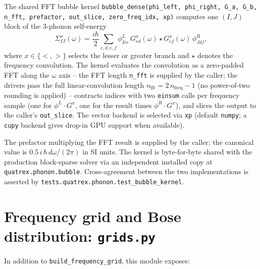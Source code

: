 The shared FFT bubble kernel
\texttt{bubble\_dense(phi\_left, phi\_right, G\_a, G\_b, n\_fft,
prefactor, out\_slice, zero\_freq\_idx, xp)} computes one $(I, J)$ block
of the 3-phonon self-energy
\begin{equation}\label{eq:bubble_block}
  \Sigma^x_{IJ}(\omega) = \frac{i\hbar}{2}\sum_{c,d,e,f}
  \phi^L_{Ice}\,
  G^x_{ed}(\omega) \star G^x_{cf}(\omega)\,
  \phi^R_{Jdf},
\end{equation}
where $x \in \{<, >\}$ selects the lesser or greater branch and
$\star$ denotes the frequency convolution.  The kernel evaluates the
convolution as a zero-padded FFT along the $\omega$ axis -- the
FFT length \texttt{n\_fft} is supplied by the caller; the drivers pass
the full linear-convolution length $n_\mathrm{fft} = 2\,n_\mathrm{freq} - 1$
(no power-of-two rounding is applied) --
contracts indices with two \texttt{einsum} calls per frequency
sample (one for $\phi^L \cdot G^x$, one for the result times $\phi^R
\cdot G^x$), and slices the output to the caller's
\texttt{out\_slice}.  The vector backend is selected via \texttt{xp}
(default \texttt{numpy}; a \texttt{cupy} backend gives drop-in GPU
support when available).

The prefactor multiplying the FFT result is supplied by the caller;
the canonical value is $0.5\,i\,\hbar\,d\omega / (2\pi)$ in SI units.
The kernel is byte-for-byte shared with the production block-sparse
solver via an independent installed copy at
\texttt{quatrex.phonon.bubble}.  Cross-agreement between the two
implementations is asserted by
\texttt{tests.quatrex.phonon.test\_bubble\_kernel}.

\section{Frequency grid and Bose distribution: \texttt{grids.py}}
\label{sec:solver_grids}

In addition to \texttt{build\_frequency\_grid}, this module exposes:

